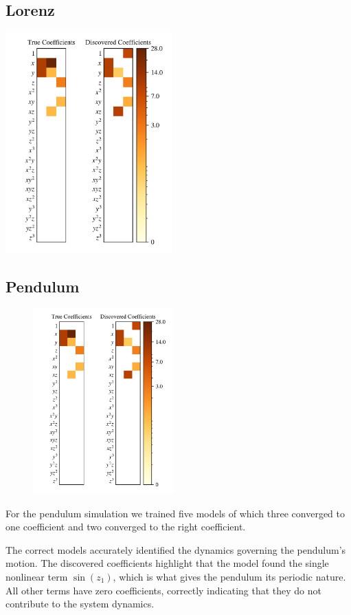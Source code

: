 \subsection{Lorenz}

\includegraphics[width=0.48\textwidth]{project_2/images/xi_plot_lorenz.png}
\label{fig:xi_plot_lorenz}

\subsection{Pendulum}


\begin{figure}[htbp]
    \centering
    \includegraphics[width=0.48\textwidth]{project_2/images/xi_plot_lorenz.png}
    \label{fig:xi_plot_lorenz}
\end{figure}

For the pendulum simulation we trained five models of which three converged to one coefficient and two converged to the right coefficient.

The correct models accurately identified the dynamics governing the pendulum's motion. The discovered coefficients highlight that the model found the single nonlinear term $\sin (z_1)$, which is what gives the pendulum its periodic nature. All other terms have zero coefficients, correctly indicating that they do not contribute to the system dynamics.